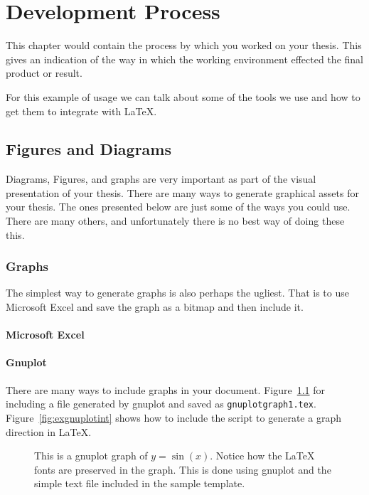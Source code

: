 \chapter{Development Process}
\label{chap:process}

This chapter would contain the process by which you worked on your thesis.  This gives an indication of the way in which the working environment effected the final product or result.

For this example of usage we can talk about some of the tools we use and how to get them to integrate with \LaTeX.

\section{Figures and Diagrams}
Diagrams, Figures, and graphs are very important as part of the visual presentation of your thesis.  There are many ways to generate graphical assets for your thesis. The ones presented below are just some of the ways you could use. There are many others, and unfortunately there is no best way of doing these this.

\subsection{Graphs}
The simplest way to generate graphs is also perhaps the ugliest.  That is to use Microsoft Excel and save the graph as a bitmap and then include it.

\subsubsection{Microsoft Excel}

\subsubsection{Gnuplot}
There are many ways to include graphs in your document.  Figure~\ref{fig:exgnuplotex} for including a file generated by gnuplot and saved as \texttt{gnuplotgraph1.tex}. Figure~\ref{fig:exgnuplotint} shows how to include the script to generate a graph direction in \LaTeX.

\begin{figure}[htp]  %
  \centering
  
  \caption[An example graph.]{This is a gnuplot graph of $y=\sin(x)$. Notice how the \LaTeX{} fonts are preserved in the graph. This is done using gnuplot and the simple text file included in the sample template.}
  \label{fig:exgnuplotex}
\end{figure}

